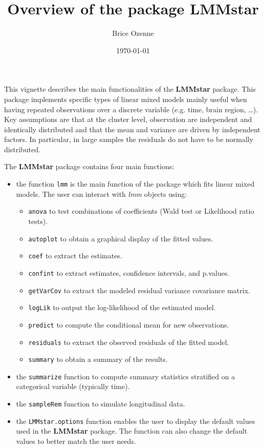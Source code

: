 \documentclass[12pt]{article}
\author{Brice Ozenne}
\date{\today}
\title{Overview of the package LMMstar}
\begin{document}
\maketitle
This vignette describes the main functionalities of the \textbf{LMMstar}
package. This package implements specific types of linear mixed models
mainly useful when having repeated observations over a discrete
variable (e.g. time, brain region, \ldots{}). Key assumptions are that at
the cluster level, observation are independent and identically
distributed and that the mean and variance are driven by independent
factors. In particular, in large samples the residuals do not have to
be normally distributed.

\bigskip

The \textbf{LMMstar} package contains four main functions:
\begin{itemize}
\item the function \texttt{lmm} is the main function of the package which fits
linear mixed models. The user can interact with \emph{lmm} objects using:
\begin{itemize}
\item \texttt{anova} to test combinations of coefficients (Wald test or Likelihood ratio tests).
\item \texttt{autoplot} to obtain a graphical display of the fitted values.
\item \texttt{coef} to extract the estimates.
\item \texttt{confint} to extract estimates, confidence intervals, and p.values.
\item \texttt{getVarCov} to extract the modeled residual variance covariance matrix.
\item \texttt{logLik} to output the log-likelihood of the estimated model.
\item \texttt{predict} to compute the conditional mean for new observations.
\item \texttt{residuals} to extract the observed residuals of the fitted model.
\item \texttt{summary} to obtain a summary of the results.
\end{itemize}
\item the \texttt{summarize} function to compute summary statistics stratified on a categorical variable (typically time).
\item the \texttt{sampleRem} function to simulate longitudinal data.
\item the \texttt{LMMstar.options} function enables the user to display the
default values used in the \textbf{LMMstar} package. The function
can also change the default values to better match the user needs.
\end{itemize}
\end{document}
